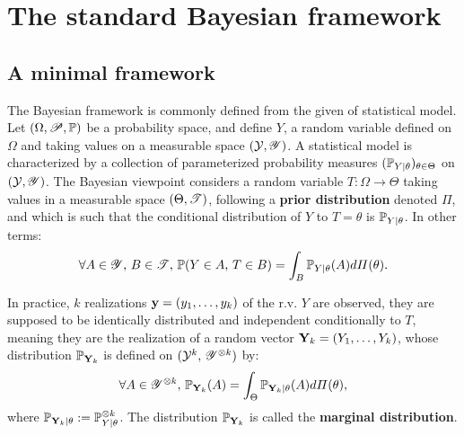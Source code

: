 

\section{The standard Bayesian framework}\label{sec:intro-ref:classical-framework}

\subsection{A minimal framework}\label{sec:intro-ref:minimalclassicframework}

The Bayesian framework is commonly defined from the given of statistical model.
Let $(\Omega,\mathscr{P},\mathbb{P})$ be a probability space, and define $Y$, a random variable defined on $\Omega$ and taking values on a measurable space $(\mathcal{Y},\mathscr{Y})$.
A statistical model is characterized by a collection of parameterized probability measures $(\mathbb{P}_{Y|\theta})_{\theta\in\Theta}$ on $(\mathcal{Y},\mathscr{Y})$.
The Bayesian viewpoint considers a random variable $T:\Omega\to\Theta$ taking values in a measurable space $(\Theta,\mathscr{T})$, following a \textbf{prior distribution} denoted $\varPi$, and which is such that the conditional distribution of $Y$ to $T=\theta$ is $\mathbb{P}_{Y|\theta}$. In other terms:
    \begin{equation}
        \forall A\in\mathscr{Y},\,B\in\mathscr{T},\, \mathbb{P}(Y\in A,\, T\in B) = \int_B \mathbb{P}_{Y|\theta}(A) d\varPi(\theta).
    \end{equation}

In practice, $k$ realizations $\mathbf{y}= (y_1,\dots,y_k)$ of the r.v. $Y$ are observed, they are supposed to be identically distributed and independent conditionally to $T$, meaning they are the realization of a random vector $\mathbf{Y}_k = (Y_1,\dots,Y_k)$, whose distribution $\mathbb{P}_{\mathbf{Y}_k}$ is defined on $(\mathcal{Y}^k,\,\mathscr{Y}^{\otimes k})$ by:
\begin{equation}
    \forall A\in\mathscr{Y}^{\otimes k},\, \mathbb{P}_{\mathbf{Y}_k}(A) = \int_\Theta \mathbb{P}_{\mathbf{Y}_k|\theta}(A)d\varPi(\theta),
\end{equation}
where $\mathbb{P}_{\mathbf{Y}_k|\theta}:=\mathbb{P}_{Y|\theta}^{\otimes k}$. The distribution $\mathbb{P}_{\mathbf{Y}_k}$ is called the \textbf{marginal distribution}.

